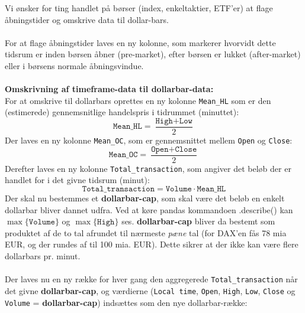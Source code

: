 \documentclass[a4paper,danish,12pt]{article}
\begin{document}
Vi ønsker for ting handlet på børser (index, enkeltaktier, ETF'er) at flage åbningstider og omskrive data til dollar-bars.\\
\\
For at flage åbningstider laves en ny kolonne, som markerer hvorvidt dette tidsrum er inden børsen åbner (pre-market), efter børsen er lukket (after-market) eller i børsens normale åbningsvindue.
\\\\
\textbf{Omskrivning af timeframe-data til dollarbar-data:} \\
For at omskrive til dollarbars oprettes en ny kolonne \texttt{Mean\_HL} som er den (estimerede) gennemsnitlige handelspris i tidrummet (minuttet):
\begin{equation*}
\texttt{Mean\_HL} = \frac{\texttt{High}+\texttt{Low}}{2}
\end{equation*} 
Der laves en ny kolonne \texttt{Mean\_OC}, som er gennemsnittet mellem \texttt{Open} og \texttt{Close}:
\begin{equation*}
\texttt{Mean\_OC} = \frac{\texttt{Open}+\texttt{Close}}{2}
\end{equation*} 
Derefter laves en ny kolonne \texttt{Total\_transaction}, som angiver det beløb der er handlet for i det givne tidsrum (minut):
\begin{equation*}
\texttt{Total\_transaction} = \texttt{Volume} \cdot \texttt{Mean\_HL}
\end{equation*}
Der skal nu bestemmes et \textbf{dollarbar-cap}, som skal være det beløb en enkelt dollarbar bliver dannet udfra. Ved at køre pandas kommandoen .describe() kan $\max\{ \texttt{Volume} \}$ og $\max\{ \texttt{High} \}$ ses. \textbf{dollarbar-cap} bliver da bestemt som produktet af de to tal afrundet til nærmeste \textit{pæne} tal (for DAX'en fås 78 mia EUR, og der rundes af til 100 mia. EUR). Dette sikrer at der ikke kan være flere dollarbars pr. minut.\\
\\
Der laves nu en ny række for hver gang den aggregerede \texttt{Total\_transaction} når det givne \textbf{dollarbar-cap}, og værdierne (\texttt{Local time}, \texttt{Open}, \texttt{High}, \texttt{Low}, \texttt{Close} og \texttt{Volume} = \textbf{dollarbar-cap}) indsættes som den nye dollarbar-række:
\end{document}

